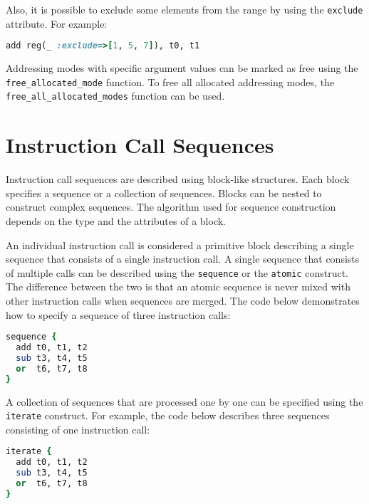\documentclass[oneside,final,12pt]{extreport}
\begin{document}
Also, it is possible to exclude some elements from the range by using the {\tt exclude}
attribute. For example:

\begin{lstlisting}[language=ruby, emph={situation, mode_allocator}]
add reg(_ :exclude=>[1, 5, 7]), t0, t1
\end{lstlisting}

Addressing modes with specific argument values can be marked as free using the
{\tt free{\_}allocated{\_}mode} function. To free all allocated addressing modes,
the  {\tt free{\_}all{\_}allocated{\_}modes} function can be used.


\section{Instruction Call Sequences}

Instruction call sequences are described using block-like structures. Each block specifies
a sequence or a collection of sequences. Blocks can be nested to construct complex sequences.
The algorithm used for sequence construction depends on the type and the attributes of a block.

An individual instruction call is considered a primitive block describing a single sequence
that consists of a single instruction call. A single sequence that consists of multiple calls
can be described using the {\tt sequence} or the {\tt atomic} construct. The difference between
the two is that an atomic sequence is never mixed with other instruction calls when sequences
are merged. The code below demonstrates how to specify a sequence of three instruction calls:

\begin{lstlisting}[language=ruby, emph={sequence}, deletekeywords={or}]
sequence {
  add t0, t1, t2
  sub t3, t4, t5
  or  t6, t7, t8
}
\end{lstlisting}

A collection of sequences that are processed one by one can be specified using the {\tt iterate}
construct. For example, the code below describes three sequences consisting of one instruction call:

\begin{lstlisting}[language=ruby, emph={iterate}, deletekeywords={or}]
iterate {
  add t0, t1, t2
  sub t3, t4, t5
  or  t6, t7, t8
}
\end{lstlisting}
\end{document}

